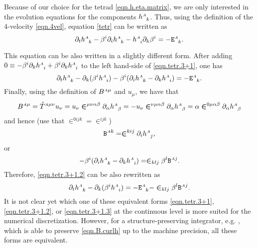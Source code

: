 \documentclass[
10pt, %
a4paper, %
oneside, %
headinclude,footinclude, %
BCOR5mm, %
]{scrartcl}
\newcommand{\sA}{\mathsmaller A}
\newcommand{\pd}[1]{\partial_{#1}}
\newcommand{\tetrsymbol}{h}
\newcommand{\tetr}[2]{\tetrsymbol^{#1}_{\phantom{#1}#2}}
\newcommand{\aD}[2]{\mathcal{D}_{\phantom{#2}#1}^{#2}}	%
\newcommand{\Efin}[2]{\mathtt{E}^{#1}_{\phantom{#1}#2}}	%
\newcommand{\BT}[2]{B^{#1#2}}	%
\newcommand{\Bfin}[2]{\mathtt{B}^{#1#2}}	%
\newcommand{\aU}{\mathcal{U}}%
\newcommand{\LCsymb}{\bm{\in}}    %
\newcommand{\HDT}[1]{\accentset{\star}{T}^{#1}}
\begin{document}
Because of our choice for the tetrad \eqref{eqn.h.eta.matrix}, we are only interested in the  
evolution equations for the components $ \tetr{\sA}{k} $. Thus, using the definition of 
the 4-velocity \eqref{eqn.4vel}, equation \eqref{tetr} can be written as
\begin{equation}\label{eqn.tetr.3+1}
	\pd{t} \tetr{\sA}{k} - \beta^i \pd{i} \tetr{\sA}{k} - \tetr{\sA}{i} \pd{k} \beta^i 
	= 
	-\Efin{\sA}{k}.
\end{equation}

This equation can be also written in a slightly different form. After adding $ 0\equiv - \beta^i 
\pd{k}\tetr{\sA}{i} + \beta^i \pd{k}\tetr{\sA}{i} $ to the left hand-side of \eqref{eqn.tetr.3+1}, 
one 
has  
\begin{equation}\label{eqn.tetr.3+1.2}
	\pd{t} \tetr{\sA}{k} - \pd{k} (\beta^i \tetr{\sA}{i}) - \beta^i (\pd{i}\tetr{\sA}{k} - 
	\pd{k}\tetr{\sA}{i})
	= 
	-\Efin{\sA}{k}.
\end{equation}
Finally, using the definition of $ \BT{\sA}{\mu} $ and $ u_\mu $, we have that 
\begin{equation}
	\BT{\sA}{\mu} = \HDT{\sA\mu\nu} u_\nu = u_\nu \LCsymb^{\mu\nu\alpha\beta} 
	\pd{\alpha}\tetr{\sA}{\beta} = -
	u_\nu \LCsymb^{\nu\mu\alpha\beta} \pd{\alpha}\tetr{\sA}{\beta} =
	\alpha \LCsymb^{0\mu\alpha\beta} \pd{\alpha}\tetr{\sA}{\beta} 
\end{equation}
and hence (use that $ \LCsymb^{0ijk} =\LCsymb^{ijk} $)
\begin{equation}\label{eqn.B.curlh}
	\Bfin{\sA}{k} = \LCsymb^{kij}\pd{i}\tetr{\sA}{j},
\end{equation}
or
\begin{equation}
	-\beta^i (\pd{i}\tetr{\sA}{k} - 
	\pd{k}\tetr{\sA}{i})
	=
	\LCsymb_{klj}\beta^l \Bfin{\sA}{j}.
\end{equation}
Therefore, \eqref{eqn.tetr.3+1.2} can be also rewritten as 
\begin{equation}\label{eqn.tetr.3+1.3}
	\pd{t} \tetr{\sA}{k} - \pd{k} (\beta^i \tetr{\sA}{i}) =  
	-\Efin{\sA}{k} - \LCsymb_{klj} \beta^l \Bfin{\sA}{j}.
\end{equation}
It is not clear yet which one of these equivalent forms \eqref{eqn.tetr.3+1}, \eqref{eqn.tetr.3+1.2}, 
or 
\eqref{eqn.tetr.3+1.3} at the continuous level is more suited for the numerical discretization. 
However, for a structure-preserving integrator, e.g. \cite{SIGPR2021}, which is able  to 
preserve \eqref{eqn.B.curlh} up to the machine precision, all these forms are equivalent.
\end{document}
